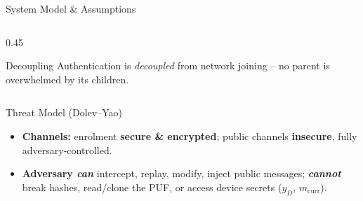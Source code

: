 \begin{frame}{System Model \& Assumptions}
\begin{columns}[T]
\begin{column}{0.45\textwidth}
\begin{exampleblock}{Decoupling}
                Authentication is \emph{decoupled} from network joining -- no parent is overwhelmed by its children.
            \end{exampleblock}
        \end{column}
    \end{columns}
    \vspace{0.15cm}
    \begin{block}{Threat Model (Dolev--Yao)}
        \begin{itemize}\setlength{\itemsep}{1pt}
            \item \textbf{Channels:} enrolment \textbf{secure \& encrypted}; public channels \textbf{insecure}, fully adversary-controlled.
            \item \textbf{Adversary \emph{can}} intercept, replay, modify, inject public messages; \textbf{\emph{cannot}} break hashes, read/clone the PUF, or access device secrets ($y_D,\, m_{\mathrm{curr}}$).
        \end{itemize}
    \end{block}
\end{frame}

